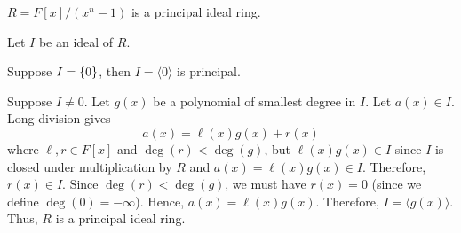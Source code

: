 \begin{Theorem}{}{}
    $ R=F[x]/(x^n-1) $ is a principal ideal ring.
\end{Theorem}

\begin{Proof}{}{}
Let $ I $ be an ideal of $ R $.

Suppose $ I=\{0\} $, then $ I=\langle 0\rangle $ is principal.

Suppose $ I\neq 0 $. Let $ g(x) $ be a polynomial of smallest
degree in $ I $. Let $ a(x)\in I $. Long division
gives
\[ a(x)=\ell(x)g(x)+r(x) \]
where $ \ell,r\in F[x] $ and $ \deg(r)<\deg(g) $, but $ \ell(x)g(x)\in I $
since $ I $ is closed under multiplication by $ R $ and
$ a(x)=\ell(x)g(x)\in I $. Therefore, $ r(x)\in I $.
Since $ \deg(r) <\deg(g) $, we must have $ r(x)=0 $ (since we define
$ \deg(0)=-\infty $). Hence, $ a(x)=\ell(x)g(x) $. Therefore,
$ I=\langle g(x) \rangle $. Thus, $ R $ is a principal ideal ring.
\end{Proof}
